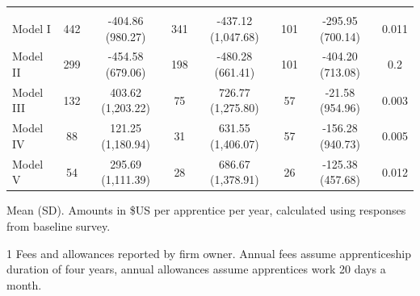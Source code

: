 \documentclass[
  11pt,
a4paper
]{report}
\begin{document}
\begin{table}[H]
{\begin{threeparttable}
\begin{tabular}[t]{lccccccc}
\addlinespace[0.3em]
\multicolumn{8}{l}{\textbf{Net Benefits}}\\
\hspace{1em}Model I & 442 & -404.86 (980.27) & 341 & -437.12 (1,047.68) & 101 & -295.95 (700.14) & 0.011\\
\hspace{1em}Model II & 299 & -454.58 (679.06) & 198 & -480.28 (661.41) & 101 & -404.20 (713.08) & 0.2\\
\hspace{1em}Model III & 132 & 403.62 (1,203.22) & 75 & 726.77 (1,275.80) & 57 & -21.58 (954.96) & 0.003\\
\hspace{1em}Model IV & 88 & 121.25 (1,180.94) & 31 & 631.55 (1,406.07) & 57 & -156.28 (940.73) & 0.005\\
\hspace{1em}Model V & 54 & 295.69 (1,111.39) & 28 & 686.67 (1,378.91) & 26 & -125.38 (457.68) & 0.012\\
\bottomrule
\end{tabular}
\begin{tablenotes}
\small
\item Mean (SD). Amounts in \$US per apprentice per year, calculated using responses from baseline survey.
\item[1] Fees and allowances reported by firm owner. Annual fees assume apprenticeship duration of four years, annual allowances assume apprentices work 20 days a month.
\end{tablenotes}
\end{threeparttable}}
\end{table}
\end{document}
